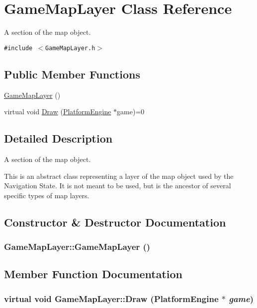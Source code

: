 \hypertarget{class_game_map_layer}{
\section{GameMapLayer Class Reference}
\label{class_game_map_layer}
}
A section of the map object.  


{\tt \#include $<$GameMapLayer.h$>$}

\subsection*{Public Member Functions}
\begin{CompactItemize}
\item 
\hyperlink{class_game_map_layer_92a1d055fbbf7f7c2d974038596b857e}{GameMapLayer} ()
\item 
virtual void \hyperlink{class_game_map_layer_9dee822c9ebe63b636039d06d43a8a32}{Draw} (\hyperlink{class_platform_engine}{PlatformEngine} $\ast$game)=0
\end{CompactItemize}


\subsection{Detailed Description}
A section of the map object. 

This is an abstract class representing a layer of the map object used by the Navigation State. It is not meant to be used, but is the ancestor of several specific types of map layers. 

\subsection{Constructor \& Destructor Documentation}
\hypertarget{class_game_map_layer_92a1d055fbbf7f7c2d974038596b857e}{
\subsubsection[{GameMapLayer}]{\setlength{\rightskip}{0pt plus 5cm}GameMapLayer::GameMapLayer ()}}
\label{class_game_map_layer_92a1d055fbbf7f7c2d974038596b857e}




\subsection{Member Function Documentation}
\hypertarget{class_game_map_layer_9dee822c9ebe63b636039d06d43a8a32}{
\subsubsection[{Draw}]{\setlength{\rightskip}{0pt plus 5cm}virtual void GameMapLayer::Draw ({\bf PlatformEngine} $\ast$ {\em game})}}
\label{class_game_map_layer_9dee822c9ebe63b636039d06d43a8a32}


